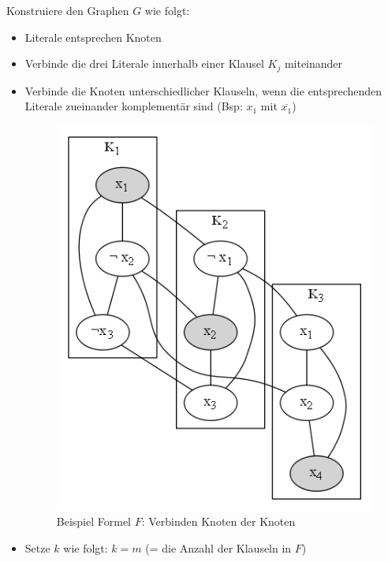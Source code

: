 \documentclass{article} %
\begin{document}
Konstruiere den Graphen $G$ wie folgt:
\begin{itemize}
	\item Literale entsprechen Knoten
	\item Verbinde die drei Literale innerhalb einer Klausel $K_j$ miteinander
	\item Verbinde die Knoten unterschiedlicher Klauseln, wenn die entsprechenden Literale zueinander komplementär sind (Bsp: $x_1$ mit $\overline{x_1}$)\\
	\begin{figure}[!htp]
		\centering
		\includegraphics[scale=0.5]{img/3Sat_Ind_Set.png}
		\caption{Beispiel Formel $F$: Verbinden Knoten der Knoten}
	\end{figure}
	\newpage
	\item Setze $k$ wie folgt: $k = m$ (= die Anzahl der Klauseln in $F$)
\end{itemize}
\end{document}
